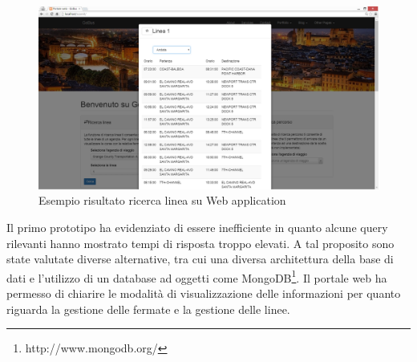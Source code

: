 \begin{figure}[tb]
\centering
\includegraphics[scale=.3]{img/20.png}
\caption{Esempio risultato ricerca linea su Web application }
\label{fig:mhs}
\end{figure} 

Il primo prototipo ha evidenziato di essere inefficiente in quanto alcune query rilevanti hanno mostrato tempi di risposta troppo elevati. A tal proposito sono state valutate diverse alternative, tra cui una diversa architettura della base di dati e l\rq utilizzo di un database ad oggetti come MongoDB\footnote{http://www.mongodb.org/ }. Il portale web ha permesso di chiarire le modalit\`{a} di visualizzazione delle informazioni per quanto riguarda la gestione delle fermate e la gestione delle linee. 

